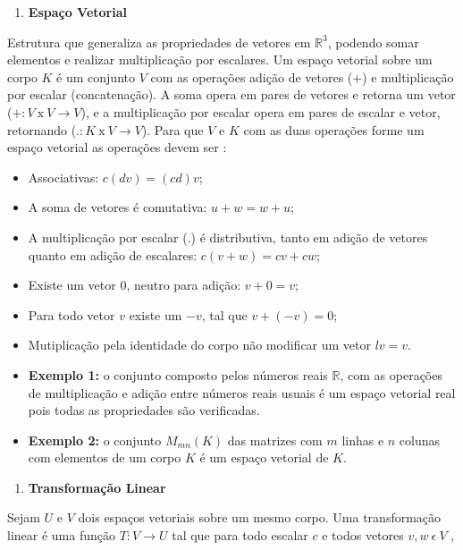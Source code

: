 \documentclass[
  openany]{book}
\providecommand{\tightlist}{%
  \setlength{\itemsep}{0pt}\setlength{\parskip}{0pt}}
\begin{document}
\begin{enumerate}
\def\labelenumi{\arabic{enumi}.}
\tightlist
\item
  \textbf{Espaço Vetorial}
\end{enumerate}

Estrutura que generaliza as propriedades de vetores em \(\mathbb{R}^3\), podendo somar elementos e realizar multiplicação por escalares. Um espaço vetorial sobre um corpo \(K\) é um conjunto \(V\) com as operações adição de vetores (\(+\)) e multiplicação por escalar (concatenação). A soma opera em pares de vetores e retorna um vetor (\(+:V\ \mbox{x} \ V \rightarrow V\)), e a multiplicação por escalar opera em pares de escalar e vetor, retornando (\(.:K \ \mbox{x} \ V \rightarrow V\)). Para que \(V\) e \(K\) com as duas operações forme um espaço vetorial as operações devem ser \citep{algebrajeronimo}:

\begin{itemize}
\item
  Associativas: \(c(dv)=(cd)v\);
\item
  A soma de vetores é comutativa: \(u+w=w+u\);
\item
  A multiplicação por escalar (.) é distributiva, tanto em adição de vetores quanto em adição de escalares: \(c(v+w)=cv+cw\);
\item
  Existe um vetor \(0\), neutro para adição: \(v+0=v\);
\item
  Para todo vetor \(v\) existe um \(-v\), tal que \(v+(-v)=0\);
\item
  Mutiplicação pela identidade do corpo não modificar um vetor \(lv=v\).
\item
  \textbf{Exemplo 1:} o conjunto composto pelos números reais \(\mathbb{R}\), com as operações de multiplicação e adição entre números reais usuais é um espaço vetorial real pois todas as propriedades são verificadas.
\item
  \textbf{Exemplo 2:} o conjunto \(M_{mn}(K)\) das matrizes com \(m\) linhas e \(n\) colunas com elementos de um corpo \(K\) é um espaço vetorial de \(K\).
\end{itemize}

\begin{enumerate}
\def\labelenumi{\arabic{enumi}.}
\setcounter{enumi}{1}
\tightlist
\item
  \textbf{Transformação Linear}
\end{enumerate}

Sejam \(U\) e \(V\) dois espaços vetoriais sobre um mesmo corpo. Uma transformação linear é uma função \(T:V\rightarrow U\) tal que para todo escalar \(c\) e todos vetores \(v,w \ \epsilon \ V\) \citep{algebrajeronimo},
\end{document}
